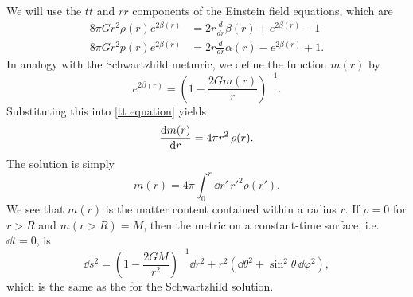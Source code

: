 %
We will use the $tt$ and $rr$ components of the Einstein field equations, which are
%
\begin{align}
    \label{tt equation}
    8 \pi G r^{2} \rho{\left(r \right)} e^{2 \beta{\left(r \right)}} 
    & =   2 r \frac{d}{d r} \beta{\left(r \right)} + e^{2 \beta{\left(r \right)}} - 1 \\
    \label{rr equation}
    8 \pi G r^{2} p{\left(r \right)} e^{2 \beta{\left(r \right)}} 
    & = 2 r \frac{d}{d r} \alpha{\left(r \right)} - e^{2 \beta{\left(r \right)}} + 1.
\end{align}
%
In analogy with the Schwartzhild metmric, we define the function $m(r)$ by
\begin{equation}
    e^{2 \beta(r)} = \left(1 - \frac{2 G m(r)}{r} \right)^{-1}. 
\end{equation}
Substituting this into \autoref{tt equation} yields 
\begin{equation}
    \diff{m(r)}{r} = 4 \pi r^2 \, \rho(r).
\end{equation}
The solution is simply
\begin{equation}
    \label{mass relation}
    m(r) = 4 \pi \int_0^r \dd r' \, {r'}^2 \rho(r').
\end{equation}
We see that $m(r)$ is the matter content contained within a radius $r$.
If $\rho = 0$ for $r > R$ and $m(r>R) = M$, then the metric on a constant-time surface, i.e. $\dd t = 0$, is
%
\begin{equation}
    \dd s^2
    = 
    \left( 1 - \frac{2 G M}{r^2} \right)^{-1} \dd r^2 
    + r^2 (\dd \theta^2 + \sin^2 \theta \, \dd\varphi^2),
\end{equation} 
%
which is the same as the for the Schwartzhild solution.

